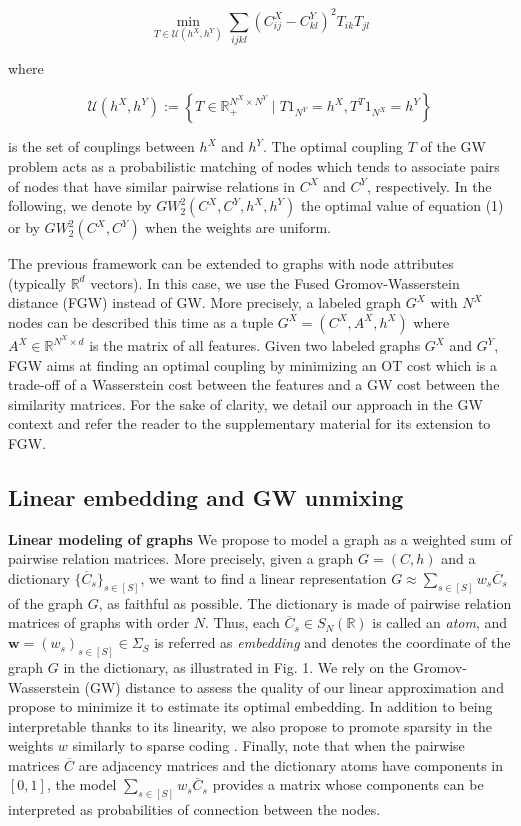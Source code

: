 \documentclass[preprint,11pt]{elsarticle}
\newcommand{\vw}{\mathbf{w}} %
\begin{document}
\begin{equation}
    \min_{T \in \mathcal{U}(h^X, h^Y)} \sum_{ijkl} \left( C^X_{ij} - C^Y_{kl} \right)^2 T_{ik} T_{jl}
\end{equation}

where

\[
    \mathcal{U}(h^X, h^Y) := \left\{ T \in \mathbb{R}^{N^X \times N^Y}_+ \mid T1_{N^Y} = h^X, T^T 1_{N^X} = h^Y \right\}
\]

is the set of couplings between \( h^X \) and \( h^Y \). The optimal coupling \( T \) of the GW problem acts as a probabilistic matching of nodes which tends to associate pairs of nodes that have similar pairwise relations in \( C^X \) and \( C^Y \), respectively. In the following, we denote by \( GW_2^2(C^X, C^Y, h^X, h^Y) \) the optimal value of equation (1) or by \( GW_2^2(C^X, C^Y) \) when the weights are uniform.

The previous framework can be extended to graphs with node attributes (typically \( \mathbb{R}^d \) vectors). In this case, we use the Fused Gromov-Wasserstein distance (FGW) \cite{Vayer2018, Vayer2019} instead of GW. More precisely, a labeled graph \( G^X \) with \( N^X \) nodes can be described this time as a tuple \( G^X = (C^X, A^X, h^X) \) where \( A^X \in \mathbb{R}^{N^X \times d} \) is the matrix of all features. Given two labeled graphs \( G^X \) and \( G^Y \), FGW aims at finding an optimal coupling by minimizing an OT cost which is a trade-off of a Wasserstein cost between the features and a GW cost between the similarity matrices. For the sake of clarity, we detail our approach in the GW context and refer the reader to the supplementary material for its extension to FGW.


\subsection{Linear embedding and GW unmixing}

\textbf{Linear modeling of graphs} We propose to model a graph  as a weighted sum of pairwise relation matrices. More precisely, given a graph \( G = (C,h) \) and a dictionary \( \{\overline{C}_s\}_{s \in [S]} \), we want to find a linear representation \( G \approx \sum_{s \in [S]} w_s \overline{C}_s \) of the graph \( G \), as faithful as possible. The dictionary is made of pairwise relation matrices of graphs with order \( N \). Thus, each \( \overline{C}_s \in S_{N}(\mathbb{R}) \) is called an \emph{atom}, and $\vw=(w_{s})_{s \in [S]} \in \Sigma_S$ is referred as
	\emph{embedding} and denotes the coordinate of the graph \( G \) in the dictionary, as illustrated in Fig. 1. We rely on the Gromov-Wasserstein (GW) distance to assess the quality of our linear approximation and propose to minimize it to estimate its optimal embedding. In addition to being interpretable thanks to its linearity, we also propose to promote sparsity in the weights \( w \) similarly to sparse coding \cite{chen2001atomic}. Finally, note that when the pairwise matrices \( \overline{C} \) are adjacency matrices and the dictionary atoms have components in \([0, 1]\), the model \( \sum_{s \in [S]} w_s \overline{C}_s \) provides a matrix whose components can be interpreted as probabilities of connection between the nodes.
\end{document}
